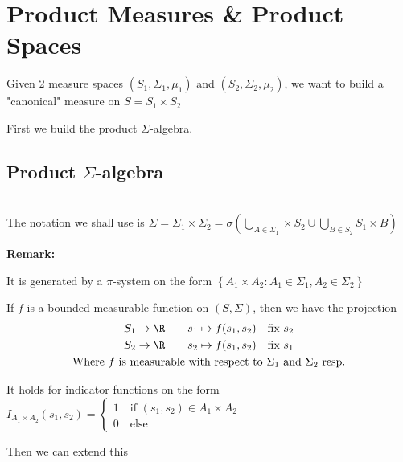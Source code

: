 \section{Product Measures \& Product Spaces}
Given 2 measure spaces $(S_1,\Sigma_1,\mu_1)$ and $(S_2,\Sigma_2,\mu_2)$, we want to build a "canonical" measure on $S = S_1\times S_2$\par
\noindent First we build the product $\Sigma$-algebra.
\par\bigskip
\subsection{Product $\Sigma$-algebra}\hfill\\
\noindent The notation we shall use is $\Sigma = \Sigma_1\times\Sigma_2 = \sigma\left(\bigcup_{A\in\Sigma_1}\times S_2\cup\bigcup_{B\in S_2}S_1\times B\right)$\par
\noindent\textbf{Remark:}\par
\noindent It is generated by a $\pi$-system on the form $\left\{A_1\times A_2: A_1\in \Sigma_1, A_2\in \Sigma_2\right\}$
\par\bigskip
\noindent If $f$ is a bounded measurable function on $(S,\Sigma)$, then we have the projection
\begin{equation*}
  \begin{gathered}
    S_1\to\R\qquad s_1\mapsto f(s_1,s_2)\quad\text{fix } s_2\\
    S_2\to\R\qquad s_2\mapsto f(s_1,s_2)\quad\text{fix } s_1\\
    \text{Where $f$ is measurable with respect to $\Sigma_1$ and $\Sigma_2$ resp.}
  \end{gathered}
\end{equation*}
\par\bigskip
\begin{prf}[]{}
  It holds for indicator functions on the form $I_{A_1\times A_2}(s_1,s_2) =\begin{cases}1\quad\text{if } (s_1,s_2)\in A_1\times A_2\\0\quad\text{else}\end{cases}$
  \par\bigskip
  \noindent Then we can extend this
\end{prf}
\par\bigskip
